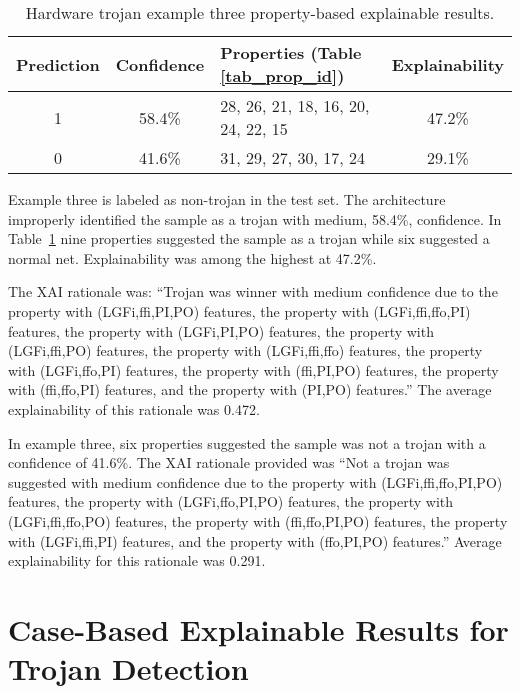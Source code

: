 \begin{table}[H]
    \renewcommand{\arraystretch}{1.3}
    \centering
    \caption{Hardware trojan example three property-based explainable results.}
    \begin{tabular}{|c|c|p{}|c|}
        \hline
         Prediction &  Confidence &  Properties (Table \ref{tab_prop_id}) &  Explainability \\
        \hline
        \hline
        1 & 58.4\% & 28, 26, 21, 18, 16, 20, 24, 22, 15 & 47.2\% \\
        \hline
        0 & 41.6\% & 31, 29, 27, 30, 17, 24 & 29.1\% \\
        \hline
    \end{tabular}
    \label{tab_prop_exp_ex_3}
\end{table}

Example three is labeled as non-trojan in the test set.  The architecture
improperly identified the sample as a trojan with medium, 58.4\%, confidence. In
Table~\ref{tab_prop_exp_ex_3} nine properties suggested the sample as a trojan while
six suggested a normal net.  Explainability was among the highest at 47.2\%.

The XAI rationale
was: ``Trojan was winner with medium confidence due to the property with
(LGFi,ffi,PI,PO) features, the property with (LGFi,ffi,ffo,PI) features, the
property with (LGFi,PI,PO) features, the property with (LGFi,ffi,PO) features,
the property with (LGFi,ffi,ffo) features, the property with (LGFi,ffo,PI)
features, the property with (ffi,PI,PO) features, the property with (ffi,ffo,PI)
features, and the property with (PI,PO) features.'' The average explainability
of this rationale was 0.472.

In example three, six properties suggested the sample was not a trojan with a
confidence of 41.6\%. The XAI rationale provided was ``Not a trojan was
suggested with medium confidence due to the property with (LGFi,ffi,ffo,PI,PO)
features, the property with (LGFi,ffo,PI,PO) features, the property with
(LGFi,ffi,ffo,PO) features, the property with (ffi,ffo,PI,PO) features, the
property with (LGFi,ffi,PI) features, and the property with (ffo,PI,PO)
features.''  Average explainability for this rationale was 0.291.

\section{Case-Based Explainable Results for Trojan Detection} \label{case_exp_results}

